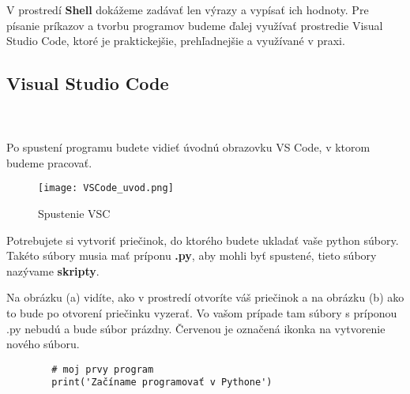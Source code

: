 \documentclass[a4paper,11pt]{report}
\begin{document}
	V prostredí \textbf{Shell} dokážeme zadávať len výrazy a vypísať ich hodnoty. Pre písanie príkazov a tvorbu programov budeme ďalej využívať prostredie Visual Studio Code, ktoré je praktickejšie, prehľadnejšie a využívané v praxi. 
	
	\subsection*{Visual Studio Code}
	
	\noindent{} \\ \\
	
	Po spustení programu budete vidieť úvodnú obrazovku VS Code, v ktorom budeme pracovať. 
	
	\begin{figure}[H]
		\centering
		\texttt{[image: VSCode\_uvod.png]}
		\caption{Spustenie VSC}
		\label{fig:uvod}
	\end{figure}
	
	Potrebujete si vytvoriť priečinok, do ktorého budete ukladať vaše python súbory. Takéto súbory musia mať príponu \textbf{.py}, aby mohli byť spustené, tieto súbory nazývame \textbf{skripty}. 
	
	\begin{figure}[H]
		\centering
		\qquad
		\label{fig:folders}%
	\end{figure}
	
	Na obrázku (a) vidíte, ako v prostredí otvoríte váš priečinok a na obrázku (b) ako to bude po otvorení priečinku vyzerať. Vo vašom prípade tam súbory s príponou .py nebudú a bude súbor prázdny. Červenou je označená ikonka na vytvorenie nového súboru. 
	
	\begin{verbatim}
		# moj prvy program
		print('Začíname programovať v Pythone')
	\end{verbatim}
	
\end{document}
